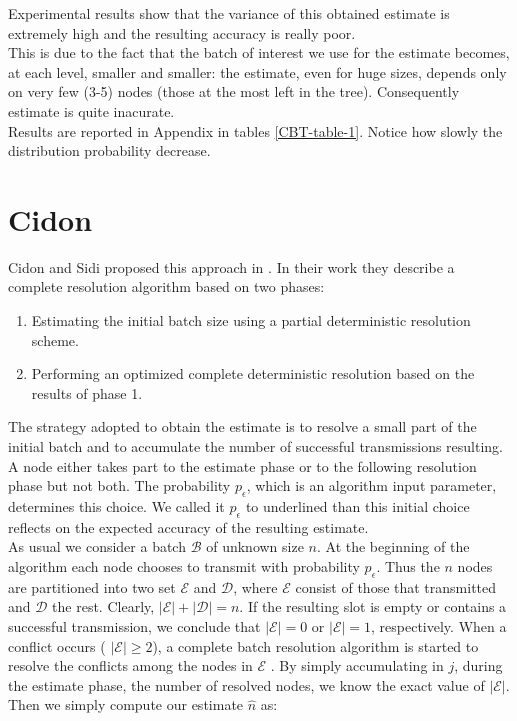 \documentclass[12pt,a4paper]{report}
\newcommand{\pc}{p_{\epsilon}}
\begin{document}
Experimental results show that the variance of this obtained estimate is extremely high and the resulting accuracy is really poor.\\ 
This is due to the fact that the batch of interest we use for the estimate becomes, at each level, smaller and smaller: the estimate, even for huge sizes, depends only on very few (3-5) nodes (those at the most left in the tree). Consequently estimate is quite inacurate.\\
Results are reported in Appendix in tables  \ref{CBT-table-1}. Notice how slowly the distribution probability decrease.
\section{Cidon}
\label{se:cidon}
Cidon and Sidi proposed this approach in \cite{cidon}. In their work they describe a complete resolution algorithm based on two phases:
 
\begin{enumerate}
\item Estimating the initial batch size using a partial deterministic resolution scheme. 
\item Performing an optimized complete deterministic resolution based on the results of phase 1. 
\end{enumerate}

The strategy adopted to obtain the estimate is to resolve a small part of the initial batch and to accumulate the number of successful transmissions resulting.\\

A node either takes part to the estimate phase or to the following resolution phase but not both.
The probability $\pc$, which is an algorithm input parameter, determines this choice.
We called it $\pc$ to underlined than this initial choice reflects on the expected accuracy of the resulting estimate.\\

As usual we consider a batch $\mathcal{B}$ of unknown size $n$.
At the beginning of the algorithm each node chooses to transmit with probability $\pc$. Thus the $n$ nodes are partitioned into two set $\mathcal{E}$ and $\mathcal{D}$, where $\mathcal{E}$ consist of those that transmitted and $\mathcal{D}$ the rest. Clearly, $|\mathcal{E}|+|\mathcal{D}|=n$. If the resulting slot is empty or contains a successful transmission, we conclude that $|\mathcal{E}|=0$  or $|\mathcal{E}|=1$, respectively. When a conflict occurs ( $|\mathcal{E}|\geq2$), a complete batch resolution algorithm is started to resolve the conflicts among  the nodes in $\mathcal{E}$ . By simply accumulating in $j$, during the estimate phase, the number of resolved nodes, we know the exact value of $|\mathcal{E}|$.
Then we simply compute our estimate $\hat{n}$ as: 
\end{document}
